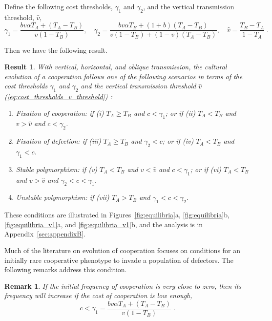 \documentclass[12pt]{extarticle}
\newtheorem{remark}{Remark}
\newtheorem{result}{Result}
\begin{document}
Define the following cost thresholds, $\gamma_1$ and $\gamma_2$, and the vertical transmission threshold, $\hat v$,
\begin{equation} \label{eq:cost_thresholds_v_threshold} 
\gamma_1 = \frac{b v \alpha T_A + (T_A - T_B)}{v(1-T_B)}, \quad
\gamma_2 = \frac{b v \alpha T_B + (1+b) (T_A - T_B)}{v(1-T_B) + (1-v)(T_A-T_B)}, \quad
\hat v = \frac{T_B - T_A}{1-T_A} \;.
\end{equation}

Then we have the following result.
\\

\begin{result}%
\label{result:vert_obli_hori}
With vertical, horizontal, and oblique transmission, the cultural evolution of a cooperation follows one of the following scenarios in terms of the cost thresholds $\gamma_1$ and $\gamma_2$ and the vertical transmission threshold $\hat v$ (\autoref{eq:cost_thresholds_v_threshold}) :

\begin{enumerate}
\item \emph{Fixation of cooperation}: 
	if \emph{(i)} $T_A \ge T_B$ and $c < \gamma_1$; or 
	if \emph{(ii)} $T_A < T_B$ and $v>\hat v$ and $c < \gamma_2$.
\item \emph{Fixation of defection}: 
    if \emph{(iii)} $T_A \ge T_B$ and $\gamma_2 < c$; or 
	if \emph{(iv)} $T_A < T_B$ and $\gamma_1 < c$.
\item \emph{Stable polymorphism}: 
    if \emph{(v)} $T_A < T_B$ and $v<\hat{v}$ and $c < \gamma_1$; or 
    if \emph{(vi)} $T_A < T_B$ and $v>\hat{v}$ and $\gamma_2 < c < \gamma_1$.
\item \emph{Unstable polymorphism}:
    if \emph{(vii)} $T_A > T_B$ and $\gamma_1 < c < \gamma_2$.
\end{enumerate}

\end{result}
These conditions are illustrated in Figures~\ref{fig:equilibria}a, \ref{fig:equilibria}b, \ref{fig:equilibria_v1}a, and \ref{fig:equilibria_v1}b, and the analysis is in Appendix~\ref{sec:appendixB}.

Much of the literature on evolution of cooperation focuses on conditions for  an initially rare cooperative phenotype to invade a population of defectors.
The following remarks address this condition.
\\

\begin{remark}%
\label{remark:rarity}
If the initial frequency of cooperation is very close to zero, then its frequency will increase if the cost of cooperation is low enough,
\begin{equation} \label{eq:unequal_transmission_from_rarity_general_case}
c < \gamma_1 = \frac{b v \alpha T_A + (T_A - T_B)}{v(1-T_B)} \;.
\end{equation} 
\end{remark}
\end{document}
